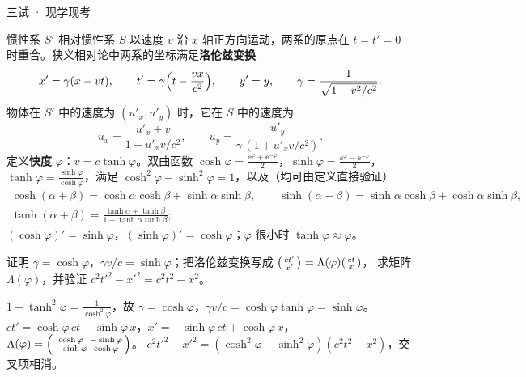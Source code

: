 \documentclass[cjk=noto, seal=first]{mojing-exam}
\newenvironment{lecture}[1]
  {\begin{tcolorbox}[colback=white, colframe=black!45, boxrule=.5pt, arc=0pt,
     left=2mm, right=2mm, top=1mm, bottom=1mm, fonttitle=\sffamily\bfseries,
     coltitle=black, colbacktitle=black!8, title={#1}]}
  {\end{tcolorbox}}
\begin{document}
\begin{paper}[time={建议 2.5 小时，含阅读（训练设置）}, full=100]{三试 · 现学现考}

\begin{lecture}{讲义 B　洛伦兹变换与快度}
惯性系 $S'$ 相对惯性系 $S$ 以速度 $v$ 沿 $x$ 轴正方向运动，两系的原点在 $t=t'=0$ 时重合。狭义相对论中两系的坐标满足\textbf{洛伦兹变换}
\[
  x'=\gamma(x-vt),\qquad t'=\gamma\Bigl(t-\frac{vx}{c^2}\Bigr),\qquad y'=y,\qquad \gamma=\frac{1}{\sqrt{1-v^2/c^2}} .
\]
物体在 $S'$ 中的速度为 $(u'_x,u'_y)$ 时，它在 $S$ 中的速度为
\[
  u_x=\frac{u'_x+v}{1+u'_xv/c^2},\qquad u_y=\frac{u'_y}{\gamma\,(1+u'_xv/c^2)} .
\]
定义\textbf{快度} $\varphi$：$v=c\tanh\varphi$。双曲函数 $\cosh\varphi=\frac{\ee^\varphi+\ee^{-\varphi}}2$，$\sinh\varphi=\frac{\ee^\varphi-\ee^{-\varphi}}2$，
$\tanh\varphi=\frac{\sinh\varphi}{\cosh\varphi}$，满足 $\cosh^2\varphi-\sinh^2\varphi=1$，以及（均可由定义直接验证）
\begin{gather*}
  \cosh(\alpha+\beta)=\cosh\alpha\cosh\beta+\sinh\alpha\sinh\beta,\qquad
  \sinh(\alpha+\beta)=\sinh\alpha\cosh\beta+\cosh\alpha\sinh\beta,\\
  \tanh(\alpha+\beta)=\frac{\tanh\alpha+\tanh\beta}{1+\tanh\alpha\tanh\beta};
\end{gather*}
$(\cosh\varphi)'=\sinh\varphi$，$(\sinh\varphi)'=\cosh\varphi$；$\varphi$ 很小时 $\tanh\varphi\approx\varphi$。
\end{lecture}

\begin{questions}
\question[8] 证明 $\gamma=\cosh\varphi$，$\gamma v/c=\sinh\varphi$；把洛伦兹变换写成 $\begin{psmallmatrix}ct'\\x'\end{psmallmatrix}=\Lambda(\varphi)\begin{psmallmatrix}ct\\x\end{psmallmatrix}$，
求矩阵 $\Lambda(\varphi)$，并验证 $c^2t'^2-x'^2=c^2t^2-x^2$。
\answerspace{2.5cm}
\begin{solution}
$1-\tanh^2\varphi=\frac1{\cosh^2\varphi}$，故 $\gamma=\cosh\varphi$，$\gamma v/c=\cosh\varphi\tanh\varphi=\sinh\varphi$。
$ct'=\cosh\varphi\,ct-\sinh\varphi\,x$，$x'=-\sinh\varphi\,ct+\cosh\varphi\,x$，$\Lambda(\varphi)=\begin{psmallmatrix}\cosh\varphi&-\sinh\varphi\\-\sinh\varphi&\cosh\varphi\end{psmallmatrix}$。
$c^2t'^2-x'^2=(\cosh^2\varphi-\sinh^2\varphi)(c^2t^2-x^2)$，交叉项相消。
\end{solution}


\end{questions}
\end{paper}
\end{document}
